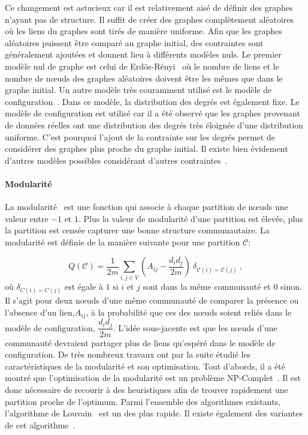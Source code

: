 Ce changement est astucieux car il est relativement aisé de définir des graphes n'ayant pas de structure.
Il suffit de créer des graphes complètement aléatoires~\cite{Erdos1959} où les liens du graphes sont tirés de manière uniforme.
Afin que les graphes aléatoires puissent être comparé au graphe initial, des contraintes sont généralement ajoutées et donnent lieu à différents modèles nuls.
Le premier modèle nul de graphe est celui de Erdös-Rényi~\cite{Erdos1959} où le nombre de liens et le nombre de n\oe uds des graphes aléatoires doivent être les mêmes que dans le graphe initial.
Un autre modèle très couramment utilisé est le modèle de configuration~\cite{Bender1978a}.
Dans ce modèle, la distribution des degrés est également fixe.
Le modèle de configuration est utilisé car il a été observé que les graphes provenant de données réelles ont une distribution des degrés très éloignée d'une distribution uniforme.
C'est pourquoi l'ajout de la contrainte sur les degrés permet de considérer des graphes plus proche du graphe initial. 
Il existe bien évidement d'autres modèles possibles considérant d'autres contraintes~\cite{Newman2009}.

\paragraph{Modularité}
La modularité~\cite{Newman2004} est une fonction qui associe à chaque partition de n\oe uds une valeur entre $-1$ et $1$.
Plus la valeur de modularité d'une partition est élevée, plus la partition est censée capturer une bonne structure communautaire.
La modularité est définie de la manière suivante pour une partition $\mathcal{C}$:

\begin{equation}
Q(\mathcal{C}) = \dfrac{1}{2m}\sum_{i,j \in V} \left(A_{ij} - \dfrac{d_id_j}{2m}\right)\ \delta_{\mathcal{C}(i)=\mathcal{C}(j)} \ ,
\end{equation}
où $\delta_{C(i)=C(j)}$ est égale à $1$ si $i$ et $j$ sont dans la même communauté et $0$ sinon.
Il s'agit pour deux n\oe uds d'une même communauté de comparer la présence ou l'absence d'un lien,$A_{ij}$, à la probabilité que ces des n\oe uds soient reliés dans le modèle de configuration, $\dfrac{d_id_j}{2m}$.
L'idée sous-jacente est que les n\oe uds d'une communauté devraient partager plus de liens qu'espéré dans le modèle de configuration.
De très nombreux travaux ont par la suite étudié les caractéristiques de la modularité et son optimisation.
Tout d'abords, il a été montré que l'optimisation de la modularité est un problème NP-Complet~\cite{Brandes2007}.
Il est donc nécessaire de recourir à des heuristiques afin de trouver rapidement une partition proche de l'optimum.
Parmi l'ensemble des algorithmes existants, l'algorithme de Louvain~\cite{Blondel2008a} est un des plus rapide.
Il existe également des variantes de cet algorithme~\cite{Huang2015,Traag2015c}.

